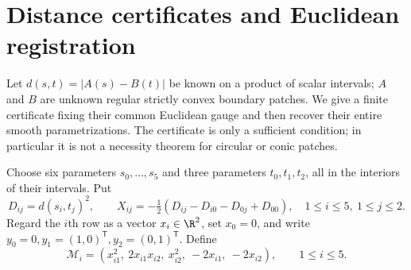 \section{Distance certificates and Euclidean registration}
\label{sec:v77-registration}

Let $d(s,t)=|A(s)-B(t)|$ be known on a product of scalar intervals;
$A$ and $B$ are unknown regular strictly convex boundary patches.  We
give a finite certificate fixing their common Euclidean gauge and then
recover their entire smooth parametrizations.  The certificate is only
a sufficient condition; in particular it is not a necessity theorem
for circular or conic patches.

Choose six parameters $s_0,\ldots,s_5$ and three parameters
$t_0,t_1,t_2$, all in the interiors of their intervals.  Put
\begin{equation}\label{eq:v77-cross-difference}
 D_{ij}=d(s_i,t_j)^2,\qquad
 X_{ij}=-\tfrac12(D_{ij}-D_{i0}-D_{0j}+D_{00}),
 \quad 1\le i\le5,\ 1\le j\le2.
\end{equation}
Regard the $i$th row as a vector $x_i\in\R^2$, set $x_0=0$, and
write $y_0=0,y_1=(1,0)^\mathsf T,y_2=(0,1)^\mathsf T$.  Define
\begin{equation}\label{eq:v77-rank-five}
 \mathcal M_i=
 (x_{i1}^2,\ 2x_{i1}x_{i2},\ x_{i2}^2,\ -2x_{i1},\ -2x_{i2}),
 \qquad 1\le i\le5.
\end{equation}

